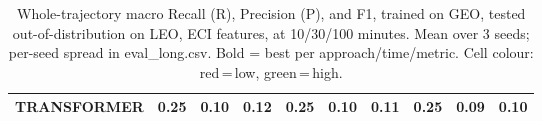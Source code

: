 \begin{table}[t]
{\begin{tabular}{l ccc ccc ccc}
\textbf{TRANSFORMER} & \cellcolor[HTML]{FF6B6B}\textbf{0.25} & \cellcolor[HTML]{FF6B6B}0.10 & \cellcolor[HTML]{FF6B6B}0.12 & \cellcolor[HTML]{FF6B6B}0.25 & \cellcolor[HTML]{FF6B6B}0.10 & \cellcolor[HTML]{FF6B6B}0.11 & \cellcolor[HTML]{FF6B6B}0.25 & \cellcolor[HTML]{FF6B6B}0.09 & \cellcolor[HTML]{FF6B6B}0.10 \\
\bottomrule
\end{tabular}%
}
\caption{Whole-trajectory macro Recall (R), Precision (P), and F1, trained on GEO, tested out-of-distribution on LEO, ECI features, at 10/30/100 minutes. Mean over 3 seeds; per-seed spread in eval\_long.csv. Bold = best per approach/time/metric. Cell colour: red\,=\,low, green\,=\,high.}
\label{tab:total_geo_to_leo_eci}
\end{table}
